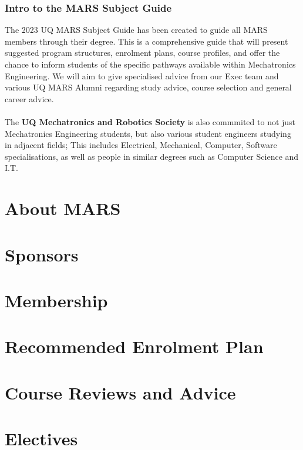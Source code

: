 \documentclass[a4paper,12pt]{report}
\begin{document}
    \subsection{Intro to the MARS Subject Guide}
    The 2023 UQ MARS Subject Guide has been created to guide all MARS members through their degree. This is a comprehensive guide that will present suggested program structures, enrolment plans, course profiles, and offer the chance to inform students of the specific pathways available within Mechatronics Engineering. We will aim to give specialised advice from our Exec team and various UQ MARS Alumni regarding study advice, course selection and general career advice. \\
    \\ The \textbf{UQ Mechatronics and Robotics Society} is also commmited to not just Mechatronics Engineering students, but also various student engineers studying in adjacent fields; This includes Electrical, Mechanical, Computer, Software specialisations, as well as people in similar degrees such as Computer Science and I.T.
\chapter*{About MARS}
\chapter*{Sponsors} %
\chapter*{Membership}  %
\chapter*{Recommended Enrolment Plan}
\chapter*{Course Reviews and Advice}
\chapter*{Electives}
\newpage
\end{document}
